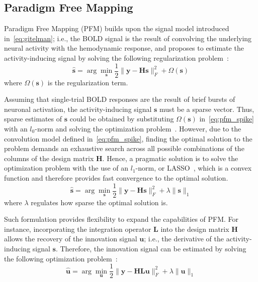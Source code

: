 
\subsection{Paradigm Free Mapping}

Paradigm Free Mapping (PFM) builds upon the signal model introduced in~\eqref{eq:gitelman}; i.e., the BOLD signal is the result of convolving the underlying neural activity with the hemodynamic response, and proposes to estimate the activity-inducing signal by solving the following regularization problem~\cite{gaudes2011detection,gaudes2013paradigm,urunuela2020stability}:
\begin{equation}
    \label{eq:pfm}
    \hat{\mathbf{s}} = \arg \min_{\mathbf{s}} \frac{1}{2} \| \mathbf{y} - \mathbf{Hs} \|_F^2 + \Omega(\mathbf{s})
\end{equation}
where \(\Omega(\mathbf{s})\) is the regularization term.

Assuming that single-trial BOLD responses are the result of brief bursts of neuronal activation, the activity-inducing signal \(\mathbf{s}\) must be a sparse vector. Thus, sparse estimates of \(\mathbf{s}\) could be obtained by substituting \(\Omega(\mathbf{s})\) in~\eqref{eq:pfm_spike} with an \(l_0\)-norm and solving the optimization problem~\cite{bruckstein2009sparse}. However, due to the convolution model defined in~\eqref{eq:pfm_spike}, finding the optimal solution to the problem demands an exhaustive search across all possible combinations of the columns of the design matrix \(\mathbf{H}\). Hence, a pragmatic solution is to solve the optimization problem with the use of an \(l_1\)-norm, or LASSO~\cite{tibshirani1996regression}, which is a convex function and therefore provides fast convergence to the optimal solution.
\begin{equation}
    \label{eq:pfm_spike}
    \hat{\mathbf{s}} = \arg \min_{\mathbf{s}} \frac{1}{2} \| \mathbf{y} - \mathbf{Hs} \|_F^2 + \lambda \| \mathbf{s} \|_1
\end{equation}
where \(\lambda\) regulates how sparse the optimal solution is.

Such formulation provides flexibility to expand the capabilities of PFM. For instance, incorporating the integration operator \(\mathbf{L}\) into the design matrix \(\mathbf{H}\) allows the recovery of the innovation signal \(\mathbf{u}\); i.e., the derivative of the activity-inducing signal \(\mathbf{s}\). Therefore, the innovation signal can be estimated by solving the following optimization problem~\cite{urunuela2020stability,cherkaoui2019sparsity}:
\begin{equation}
    \label{eq:pfm_block}
    \hat{\mathbf{u}} = \arg \min_{\mathbf{u}} \frac{1}{2} \| \mathbf{y} - \mathbf{HLu} \|_F^2 + \lambda \| \mathbf{u} \|_1
\end{equation}

